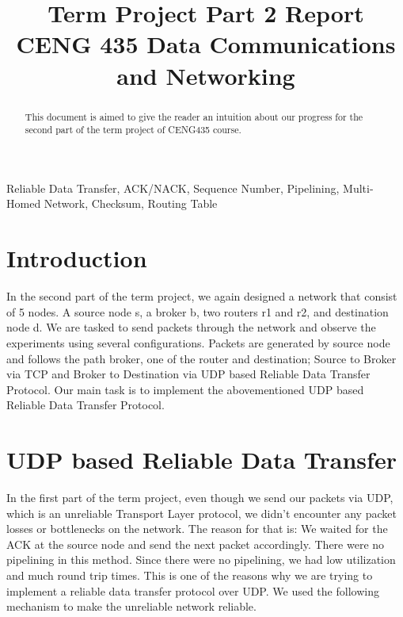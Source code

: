 \documentclass[conference]{IEEEtran}
\begin{document}
\title{Term Project Part 2 Report\\
{\footnotesize CENG 435 Data Communications and Networking}
}

\author{
\and
{}
}

\maketitle

\begin{abstract}
This document is aimed to give the reader an intuition about our progress for the second part of the term project of CENG435 course.
\end{abstract}

\begin{IEEEkeywords}
Reliable Data Transfer, ACK/NACK, Sequence Number, Pipelining, Multi-Homed Network, Checksum, Routing Table
\end{IEEEkeywords}

\section{Introduction}
In the second part of the term project, we again designed a network that consist of 5 nodes. A source node s, a broker b, two routers r1 and r2, and destination node d. We are tasked to send packets through the network and observe the experiments using several configurations. Packets are generated by source node and follows the path broker, one of the router and destination; Source to Broker via TCP and Broker to Destination via UDP based Reliable Data Transfer Protocol. Our main task is to implement the abovementioned UDP based Reliable Data Transfer Protocol.
\section{UDP based Reliable Data Transfer}
In the first part of the term project, even though we send our packets via UDP, which is an unreliable Transport Layer protocol, we didn't encounter any packet losses or bottlenecks on the network. The reason for that is: We waited for the ACK at the source node and send the next packet accordingly. There were no pipelining in this method. Since there were no pipelining, we had low utilization and much round trip times. This is one of the reasons why we are trying to implement a reliable data transfer protocol over UDP. We used the following mechanism to make the unreliable network reliable.
\end{document}
